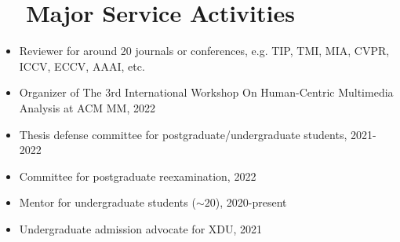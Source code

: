 \documentclass[a4paper,36pt]{article}
\newcommand{\resumeItem}[2]{
  \item\justifying\small{
    \textbf{#1}{: #2 \vspace{-2pt}}
  }
}
\newcommand{\resumeItemWithoutTitle}[1]{
  \item\justifying\small{
    {#1 \vspace{-2pt}}
  }
}
\newcommand{\resumeSubItem}[2]{\resumeItem{#1}{#2}\vspace{-3pt}}
\newcommand{\resumeSubHeadingListStart}{\begin{itemize}[leftmargin=*]}
\newcommand{\resumeSubHeadingListEnd}{\end{itemize}}
\begin{document}



\iffalse
\section{~~Major Service Activities}
\resumeSubHeadingListStart
\resumeItemWithoutTitle{Reviewer for around 20 journals or conferences, e.g. TIP, TMI, MIA, CVPR, ICCV, ECCV, AAAI, etc.}
\resumeItemWithoutTitle{Organizer of The 3rd International Workshop On Human-Centric Multimedia Analysis at ACM MM, 2022}
\resumeItemWithoutTitle{Thesis defense committee for postgraduate/undergraduate students, 2021-2022 }
\resumeItemWithoutTitle{Committee for postgraduate reexamination, 2022 }
\resumeItemWithoutTitle{Mentor for undergraduate students ($\sim20$), 2020-present}
\resumeItemWithoutTitle{Undergraduate admission advocate for XDU, 2021}
\resumeSubHeadingListEnd
\vspace{1pt}
\end{document}
